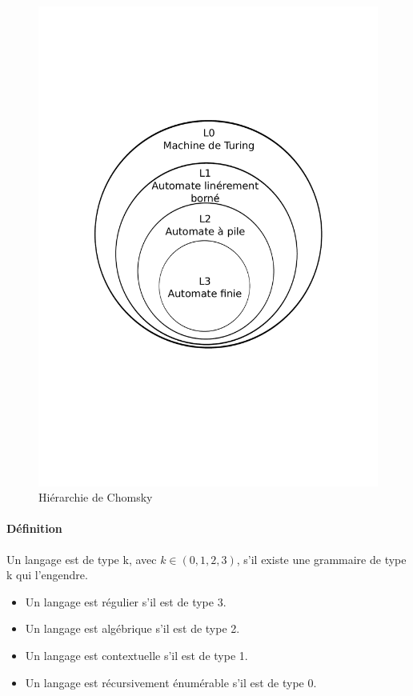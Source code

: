 \begin{figure}
\center
\label{maqao}
\includegraphics[width=16cm]{part_3/images/hierarchie_chomsky.pdf}
\caption{Hiérarchie de Chomsky}
\end{figure}


\paragraph{Définition} %
\label{subp:d_finition}

Un langage est de type k, avec $k \in (0,1,2,3)$, s'il existe une grammaire de type k qui l'engendre.
\begin{itemize}
	\item Un langage est régulier s'il est de type 3.
	\item Un langage est algébrique s'il est de type 2.
	\item Un langage est contextuelle s'il est de type 1.
	\item Un langage est récursivement énumérable s'il est de type 0.
\end{itemize}

